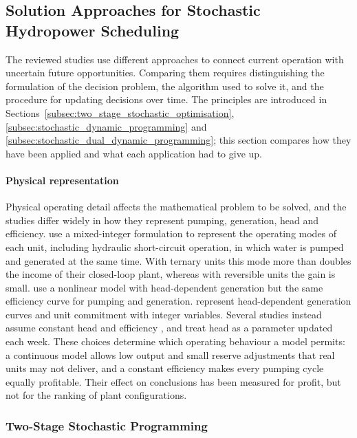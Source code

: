 \subsection{Solution Approaches for Stochastic Hydropower Scheduling}
\label{sec:lit_methods}

The reviewed studies use different approaches to connect current
operation with uncertain future opportunities. Comparing them requires
distinguishing the formulation of the decision problem, the algorithm
used to solve it, and the procedure for updating decisions over time.
The principles are introduced in
Sections~\ref{subsec:two_stage_stochastic_optimisation},
\ref{subsec:stochastic_dynamic_programming} and
\ref{subsec:stochastic_dual_dynamic_programming}; this section compares
how they have been applied and what each application had to give up.

\paragraph{Physical representation}
Physical operating detail affects the mathematical problem to be solved,
and the studies differ widely in how they represent pumping, generation,
head and efficiency. \citet{chazarra2017} use a mixed-integer
formulation to represent the operating modes of each unit, including
hydraulic short-circuit operation, in which water is pumped and
generated at the same time. With ternary units this mode more than
doubles the income of their closed-loop plant, whereas with reversible
units the gain is small. \citet{ak2019quantifying} use a nonlinear model with
head-dependent generation but the same efficiency curve for pumping and
generation. \citet{helseth2017iet} represent head-dependent
generation curves and unit commitment with integer variables. Several
studies instead assume constant head and efficiency
\citep{alic2023optimal,naval2025optimization,zisos2023mixing}, and
\citet{helseth2017} treat head as a parameter updated each week. These
choices determine which operating behaviour a model permits: a
continuous model allows low output and small reserve adjustments that
real units may not deliver, and a constant efficiency makes every
pumping cycle equally profitable. Their effect on conclusions has been
measured for profit, but not for the ranking of plant configurations.

\subsubsection{Two-Stage Stochastic Programming}

